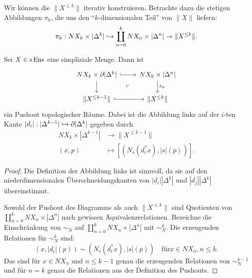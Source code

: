 Wir können die $\|X^{\leq k}\|$ iterativ konstruieren. Betrachte dazu
die stetigen Abbildungen $\pi_k$, die uns den ``$k$-dimensionalen
Teil'' von $\|X\|$ liefern:
\[ \pi_k: NX_k \times |\Delta^k|
  \hookrightarrow \coprod_{n=0}^k NX_n \times |\Delta^n|
  \twoheadrightarrow \|X^{\leq k}\|. \]

\begin{prop}
  Sei $X \in \operatorname{s}\operatorname{Ens}$ eine simpliziale Menge. Dann ist
  \[ \begin{tikzcd}
    NX_k \times \del |\Delta^k| \arrow[r, hook] \arrow[d]
    \arrow[dr, phantom, "\ulcorner"]
    & NX_k \times |\Delta^n| \arrow[d, "\pi_k"] \\
    \|X^{\leq k-1}\| \arrow[r, hook]
    & \|X^{\leq k}\|
  \end{tikzcd} \]
  ein Pushout topologischer Räume. Dabei ist die Abbildung links auf
  der $i$-ten Kante $|d_i|: |\Delta^{k-1}| \hookrightarrow \partial |\Delta^k|$
  gegeben durch
  \begin{align*}
    NX_k \times |\Delta^{k-1}| &\to \|X^{\leq k-1}\| \\
    (x, p) &\mapsto [(N_s(d_i^* x), |s|(p))].
  \end{align*}
\end{prop}
\begin{proof}
  Die Definition der Abbildung links ist sinnvoll, da sie auf den
  niederdimensionalen Überschneidungskanten von $|d_i| |\Delta^k|$ und
  $|d_j| |\Delta^k|$ übereinstimmt.
  
  Sowohl der Pushout des Diagramms als auch $\|X^{\leq k}\|$ sind
  Quotienten von $\coprod_{n=0}^k NX_n \times |\Delta^n|$ nach
  gewissen Äquivalenzrelationen. Bezeichne die Einschränkung von
  $\sim_N$ auf $\coprod_{n=0}^k NX_n \times |\Delta^n|$ mit
  $\sim_N^k$. Die erzeugenden Relationen für $\sim_N^k$ sind:
  \[ (x, |d_i|(p)) \sim (N_s(d_i^* x), |s|(p))
  \quad \text{für} x \in NX_n, n \leq k. \]
  Das sind für $x \in NX_n$ und $n \leq k-1$ genau die erzeugenden
  Relationen von $\sim_N^{k-1}$ und für $n = k$ genau die Relationen
  aus der Definition des Pushouts.
\end{proof}

